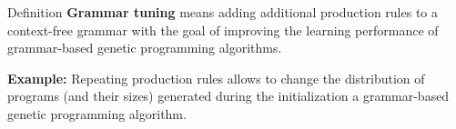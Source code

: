 \begin{frame}
\vspace*{2mm}
\begin{block}{
Definition
}
{\bf Grammar tuning} means adding additional production rules
to a context-free grammar with the goal of improving the learning
performance of grammar-based genetic programming algorithms.
 
{\bf Example:} Repeating production rules allows to change the distribution
of programs (and their sizes) generated during the initialization a grammar-based
genetic programming algorithm.
\end{block}
\end{frame}